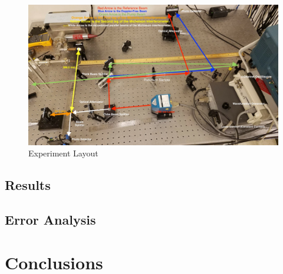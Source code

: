 \documentclass[12pt]{article}
\begin{document}
\begin{figure}%
	\centering
	\includegraphics[width=\textwidth]{DFS_Layout.jpg}
	\caption{Experiment Layout}%
	\label{fig:Layout}%
\end{figure}

\subsection*{Results}

\subsection*{Error Analysis}

\section*{Conclusions}





\end{document}
